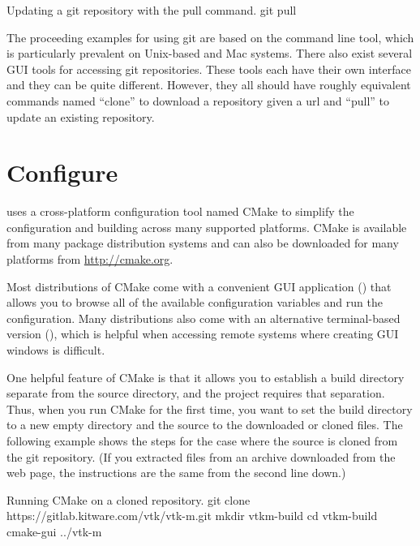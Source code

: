 \begin{blankexample}{Updating a git repository with the pull command.}
git pull
\end{blankexample}

\begin{didyouknow}
  The proceeding examples for using git are based on the  command line tool, which is particularly prevalent on Unix-based and Mac systems.
  There also exist several GUI tools for accessing git repositories.
  These tools each have their own interface and they can be quite different.
  However, they all should have roughly equivalent commands named ``clone'' to download a repository given a url and ``pull'' to update an existing repository.
\end{didyouknow}



\section{Configure \VTKm}
\label{sec:ConfigureVTKm}


\VTKm uses a cross-platform configuration tool named CMake to simplify the configuration and building across many supported platforms.
CMake is available from many package distribution systems and can also be downloaded for many platforms from \url{http://cmake.org}.

Most distributions of CMake come with a convenient GUI application () that allows you to browse all of the available configuration variables and run the configuration.
Many distributions also come with an alternative terminal-based version (), which is helpful when accessing remote systems where creating GUI windows is difficult.

One helpful feature of CMake is that it allows you to establish a build directory separate from the source directory, and the \VTKm project requires that separation.
Thus, when you run CMake for the first time, you want to set the build directory to a new empty directory and the source to the downloaded or cloned files.
The following example shows the steps for the case where the \VTKm source is cloned from the git repository.
(If you extracted files from an archive downloaded from the \VTKm web page, the instructions are the same from the second line down.)

\begin{blankexample}[ex:RunningCMake]{Running CMake on a cloned \VTKm repository.}
git clone https://gitlab.kitware.com/vtk/vtk-m.git
mkdir vtkm-build
cd vtkm-build
cmake-gui ../vtk-m
\end{blankexample}


